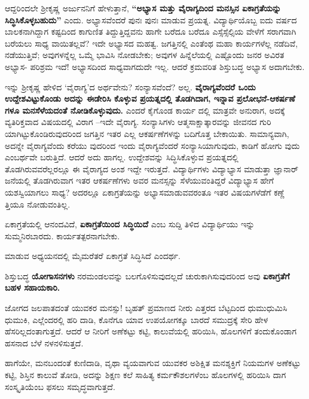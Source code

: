 ಆದ್ದರಿಂದಲೇ ಶ್ರೀಕೃಷ್ಣ ಅರ್ಜುನನಿಗೆ ಹೇಳುತ್ತಾನೆ, \textbf{“ಅಭ್ಯಾಸ ಮತ್ತು ವೈರಾಗ್ಯದಿಂದ ಮನಸ್ಸಿನ ಏಕಾಗ್ರತೆಯನ್ನು ಸಿದ್ಧಿಸಿಕೊಳ್ಳಬಹುದು”} ಎಂದು. ಅಭ್ಯಾಸವೆಂದರೆ ಪುನಃ ಪುನಃ ಮಾಡುವ ಪ್ರಯತ್ನ. ವಿದ್ಯಾರ್ಥಿಯೊಬ್ಬ ಐದು ವರ್ಷದ ಬಾಲಕನಾಗಿದ್ದಾಗ ಕಷ್ಟದಿಂದ ಕಾಗುಣಿತ ತಿದ್ದುತ್ತಿದ್ದವನು ಹಾಗೇ ಬರೆದೂ ಬರೆದೂ ಎಸ್ಸೆಸ್ಸೆಲ್ಸಿಯ ವೇಳೆಗೆ ಸರಾಗವಾಗಿ ಬರೆಯಲು ಸಾಧ್ಯ ವಾಯಿತಲ್ಲವೆ? ಇದೇ ಅಭ್ಯಾಸದ ಮಹತ್ವ. ಜಗತ್ತಿನಲ್ಲಿ ಎಂತೆಂಥ ಮಹಾ ಕಾರ್ಯಗಳೆಲ್ಲ ನಡೆದಿವೆ, ನಡೆಯುತ್ತಿವೆ; ಅವುಗಳನ್ನೆಲ್ಲ ಒಮ್ಮೆ ಭಾವಿಸಿ ನೋಡಬೇಕು; ಅವುಗಳ ಹಿನ್ನೆಲೆಯಲ್ಲಿ ಎಷ್ಟೊಂದು ಜನರ ಅವಿರತ ಅಭ್ಯಾಸ- ಪರಿಶ್ರಮ ಇದೆ! ಅಭ್ಯಾಸದಿಂದ ಸಾಧ್ಯವಾಗದುದೇ ಇಲ್ಲ. ಆದರೆ ಕ್ರಮವರಿತ ಶಿಸ್ತುಬದ್ಧ ಅಭ್ಯಾಸ ಅದಾಗಬೇಕು.

ಇನ್ನು ಶ್ರೀಕೃಷ್ಣ ಹೇಳಿದ ‘ವೈರಾಗ್ಯ’ದ ಅರ್ಥವೇನು? ಸಂನ್ಯಾಸವೆಂದೆ? ಅಲ್ಲ. \textbf{ವೈರಾಗ್ಯವೆಂದರೆ ಒಂದು ಉದ್ದೇಶವಿಟ್ಟುಕೊಂಡು ಅದನ್ನು ಈಡೇರಿಸಿ ಕೊಳ್ಳುವ ಪ್ರಯತ್ನದಲ್ಲಿ ತೊಡಗಿದಾಗ, ಇನ್ನಾವ ಪ್ರಲೋಭನೆ-ಆಕರ್ಷಣೆ ಗಳೂ ಮನಸೆಳೆಯದಂತೆ ನೋಡಿಕೊಳ್ಳುವುದು.} ಎಂದರೆ ಕೈಗೊಂಡ ಕಾರ್ಯ ದಲ್ಲಿ ಮಾತ್ರವೇ ಅನುರಾಗ, ಅದಕ್ಕೆ ವ್ಯತಿರಿಕ್ತವಾದ ವಿಷಯದಲ್ಲಿ ವಿರಾಗ –ಇದೇ ವೈರಾಗ್ಯ. ಸಂನ್ಯಾಸಿಗಳು ಆತ್ಮಸಾಕ್ಷಾತ್ಕಾರವನ್ನು ಜೀವನದ ಗುರಿ ಯಾಗಿಟ್ಟುಕೊಂಡಿರುವುದರಿಂದ ಜಗತ್ತಿನ ಇತರ ಎಲ್ಲ ಆಕರ್ಷಣೆಗಳನ್ನು ಬದಿಗೊತ್ತ ಬೇಕಾಯಿತು. ಸಾಮಾನ್ಯವಾಗಿ, ಅದನ್ನೇ ವೈರಾಗ್ಯವೆಂದು ಕರೆಯು ವುದರಿಂದ ಇಂದು ವೈರಾಗ್ಯವೆಂದರೆ ಸಂನ್ಯಾಸಿಯಾಗುವುದು, ಕಾಡಿಗೆ ಹೋಗು ವುದು ಎಂಬರ್ಥವೇ ಬರುತ್ತಿದೆ. ಆದರೆ ಅದು ಹಾಗಲ್ಲ. ಉದ್ದೇಶವನ್ನು ಸಿದ್ಧಿಸಿಕೊಳ್ಳುವ ಪ್ರಯತ್ನದಲ್ಲಿ ತೊಡಗಿರುವವರೆಲ್ಲರಲ್ಲೂ ಈ ವೈರಾಗ್ಯದ ಅಂಶ ಇದ್ದೇ ಇರುತ್ತದೆ. ವಿದ್ಯಾರ್ಥಿಗಳು ವಿದ್ಯಾಭ್ಯಾಸ ಮಾಡುತ್ತಾ ಜ್ಞಾನಾರ್ ಜನೆಯಲ್ಲಿ ತೊಡಗಿರುವಾಗ ಇತರ ಆಕರ್ಷಣೆಗಳು ಅವರ ಮನಸ್ಸನ್ನು ಸೆಳೆಯುವಂತಿದ್ದರೆ ವಿದ್ಯಾಭ್ಯಾಸ ಹೇಗೆ ಯಶಸ್ವಿಯಾಗಲು ಸಾಧ್ಯ? ಅದರಲ್ಲೂ ಏಕಾಗ್ರತೆಯನ್ನು ಅಭ್ಯಾಸಮಾಡುವವರಂತೂ ಇತರ ವಿಷಯಗಳೆಡೆಗೆ ಕಣ್ಣೆ ತ್ತಿಯೂ ನೋಡುವಂತಿಲ್ಲ.

ಏಕಾಗ್ರತೆಯಲ್ಲಿ ಆನಂದವಿದೆ, \textbf{ಏಕಾಗ್ರತೆಯಿಂದ ಸಿದ್ಧಿಯಿದೆ} ಎಂಬ ಸುದ್ದಿ ತಿಳಿದ ವಿದ್ಯಾರ್ಥಿಯು ಇನ್ನು ಸುಮ್ಮನಿರಬಾರದು. ಕಾರ್ಯತತ್ಪರನಾಗಬೇಕು.

\delimiter

ಮಾಡುವ ಅಧ್ಯಯನದಲ್ಲಿ ಮೈಮರೆತರೆ ಏಕಾಗ್ರತೆ ಸಿದ್ಧಿಸಿದೆ ಎಂದರ್ಥ.

\delimiter

ಶಿಸ್ತುಬದ್ಧ \textbf{ಯೋಗಾಸನಗಳು} ನರಮಂಡಲವನ್ನು ಬಲಗೊಳಿಸುವುದಲ್ಲದೆ ಚುರುಕಾಗಿಸುವುದರಿಂದ ಅವು \textbf{ಏಕಾಗ್ರತೆಗೆ ಬಹಳ ಸಹಾಯಕಾರಿ.}

\delimiter

ಜೋಗದ ಜಲಪಾತದಂತೆ ಯುವಕರ ಮನಸ್ಸು! ಬೃಹತ್ ಪ್ರಮಾಣದ ನೀರು ಎತ್ತರದ ಬೆಟ್ಟದಿಂದ ಧುಮುಧುಮಿಸಿ ಧುಮುಕಿ, ಎಲ್ಲೆಂದರಲ್ಲಿ ಹರಿ ದಾಡಿ, ಕೊನೆಗೂ ಯಾವ ಉಪಯೋಗಕ್ಕೂ ಬಾರದೆ ಸಮುದ್ರಕ್ಕೆ ಸೇರಿ ಹೇಳ ಹೆಸರಿಲ್ಲದಂತಾಗುತ್ತದೆ. ಆದರೆ ಆ ನೀರಿಗೆ ಅಣೆಕಟ್ಟು ಕಟ್ಟಿ, ಕಾಲುವೆಯಲ್ಲಿ ಹರಿಯಿಸಿ, ಹೊಲಗಳಿಗೆ ತಂದುಕೊಂಡಾಗ ಹಸನಾದ ಬೆಳೆ ನಳನಳಿಸುತ್ತದೆ.

ಹಾಗೆಯೇ, ಮನಬಂದಂತೆ ಕುಣಿದಾಡಿ, ವೃಥಾ ವ್ಯಯವಾಗುವ ಯುವಕರ ಅಶಿಕ್ಷಿತ ಮನಶ್ಶಕ್ತಿಗೆ ನಿಯಮಗಳ ಅಣೆಕಟ್ಟು ಕಟ್ಟಿ, ಶಿಸ್ತಿನ ಕಾಲುವೆ ತೋಡಿ, ಅದನ್ನು ಶಿಕ್ಷಣ ಕಲೆ ಸಾಹಿತ್ಯ ಕರ್ಮಕೌಶಲಗಳೆಂಬ ಹೊಲಗಳಲ್ಲಿ ಹರಿಯಿಸಿ ದಾಗ ಸಂಸ್ಕೃತಿಯೆಂಬ ಫಸಲು ಸಮೃದ್ಧವಾಗುತ್ತದೆ.

